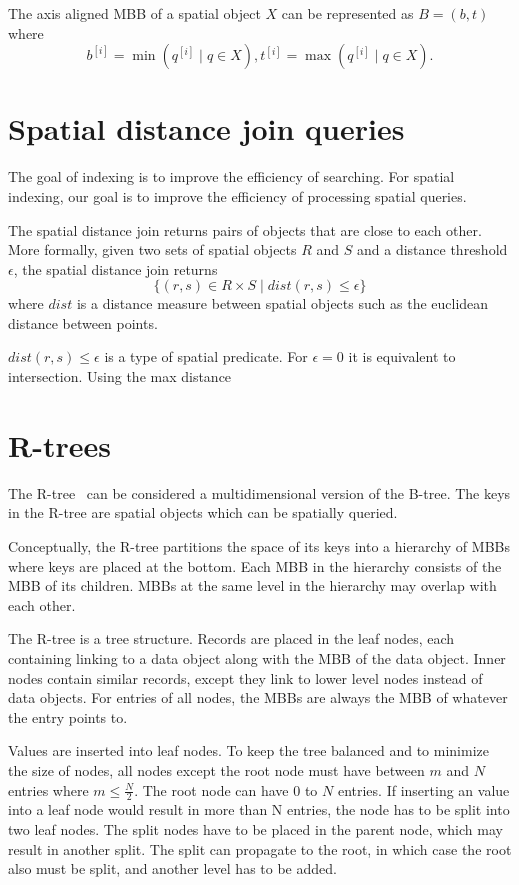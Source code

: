 The axis aligned MBB of a spatial object \(X\) can be represented as \(B = (b, t)\) where
\[
  b^{[i]} = \min\left( q^{[i]} \mid q \in X \right)
  ,
  t^{[i]} = \max\left( q^{[i]} \mid q \in X \right).
\]

\section{Spatial distance join queries}

The goal of indexing is to improve the efficiency of searching. For spatial indexing, our goal is to improve the efficiency of processing spatial queries.

The spatial distance join returns pairs of objects that are close to each other. More formally, given two sets of spatial objects \(R\) and \(S\) and a distance threshold \(\epsilon\), the spatial distance join returns
\[
  \{ (r, s) \in R \times S \mid dist(r, s) \leq \epsilon \}
\]
where \(dist\) is a distance measure between spatial objects such as the euclidean distance between points.

\(dist(r, s) \leq \epsilon\) is a type of spatial predicate. For \(\epsilon = 0\) it is equivalent to intersection. Using the max distance 

\section{R-trees}

The R-tree~\cite{guttman1984r} can be considered a multidimensional version of the B-tree. The keys in the R-tree are spatial objects which can be spatially queried.

Conceptually, the R-tree partitions the space of its keys into a hierarchy of MBBs where keys are placed at the bottom. Each MBB in the hierarchy consists of the MBB of its children. MBBs at the same level in the hierarchy may overlap with each other.

The R-tree is a tree structure. Records are placed in the leaf nodes, each containing linking to a data object along with the MBB of the data object. Inner nodes contain similar records, except they link to lower level nodes instead of data objects. For entries of all nodes, the MBBs are always the MBB of whatever the entry points to.

Values are inserted into leaf nodes. To keep the tree balanced and to minimize the size of nodes, all nodes except the root node must have between \(m\) and \(N\) entries where \(m \leq \frac{N}{2}\). The root node can have \(0\) to \(N\) entries. If inserting an value into a leaf node would result in more than N entries, the node has to be split into two leaf nodes. The split nodes have to be placed in the parent node, which may result in another split. The split can propagate to the root, in which case the root also must be split, and another level has to be added.
